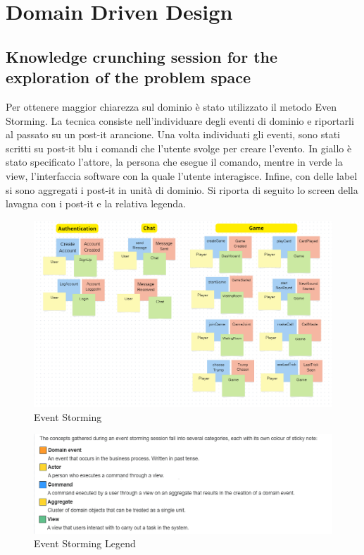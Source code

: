 \chapter{Domain Driven Design}
\label{ch:ddd} %

\section{Knowledge crunching session for the exploration of the problem space}
Per ottenere maggior chiarezza sul dominio è stato utilizzato il metodo Even Storming. 
La tecnica consiste nell'individuare degli eventi di dominio e riportarli al passato su un post-it arancione.
Una volta individuati gli eventi, sono stati scritti su post-it blu i comandi che l'utente svolge per creare l'evento.
In giallo è stato specificato l'attore, la persona che esegue il comando, mentre in verde la view, l'interfaccia software
 con la quale l'utente interagisce.
 Infine, con delle label si sono aggregati i post-it in unità di dominio.
 Si riporta di seguito lo screen della lavagna con i post-it e la relativa legenda.
 \begin{figure}[h!]
    \centering 
    \includegraphics[scale=0.45]{report/img/EventStorming.png}
    \caption{Event Storming}
    \label{event_storming}
\end{figure}

\begin{figure}[h!]
    \centering 
    \includegraphics[scale=0.60]{report/img/Event_storming_legend.png}
    \caption{Event Storming Legend}
    \label{legend}
\end{figure}

